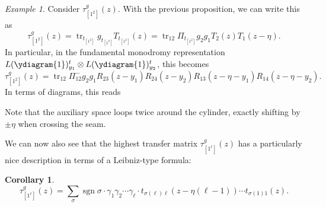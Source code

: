 \documentclass[11pt]{report}
\newtheorem{corollary}[theorem]{Corollary}
\theoremstyle{definition}
\theoremstyle{remark}
\theoremstyle{remark}
\newtheorem*{example}{Example}
\begin{document}
\begin{example}
Consider $\tau_{[1^2]}^g(z)$. With the previous proposition, we can write this as
\begin{equation*}
\tau_{[1^2]}^g(z) = \operatorname{tr}_{t_{[1^2]}} g_{t_{[1^2]}} T_{t_{[1^2]}}(z) = \operatorname{tr}_{12} \Pi_{t_{[1^2]}} g_2 g_1 T_2(z) T_1(z-\eta).
\end{equation*}
In particular, in the fundamental monodromy representation $L(\ydiagram{1})_{y_1}^t \otimes L(\ydiagram{1})_{y_2}^t$, this becomes
\begin{equation*}
\tau_{[1^2]}^g(z) = \operatorname{tr}_{12} \Pi_{12}^- g_2 g_1 R_{23}(z-y_1) R_{24}(z-y_2) R_{13}(z-\eta-y_1) R_{14}(z-\eta-y_2).
\end{equation*}
In terms of diagrams, this reads
~\\
\begin{center}
\end{center}
Note that the auxiliary space loops twice around the cylinder, exactly shifting by $\pm \eta$ when crossing the seam.
\end{example}

We can now also see that the highest transfer matrix $\tau_{[1^\ell]}^g(z)$ has a particularly nice description in terms of a Leibniz-type formula:

\begin{corollary}
\begin{equation*}
\tau_{[1^\ell]}^g(z) = \sum_\sigma \operatorname{sgn} \sigma \cdot \gamma_1 \gamma_2 \cdots \gamma_\ell \cdot t_{\sigma(\ell)\ell}(z-\eta (\ell-1)) \cdots t_{\sigma(1)1}(z).
\end{equation*}
\end{corollary}
\end{document}
